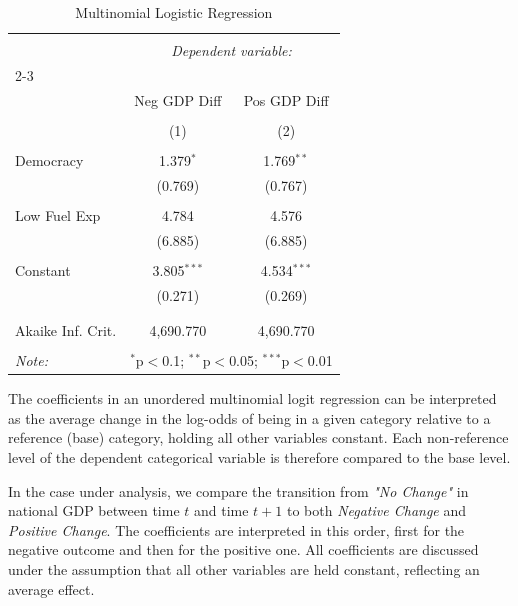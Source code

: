 \documentclass[12pt,letterpaper]{article}
\begin{document}
\begin{table}[!htbp] \centering 
	\caption{Multinomial Logistic Regression} 
	\label{} 
	\begin{tabular}{@{\extracolsep{5pt}}lcc} 
		\\[-1.8ex]\hline 
		\hline \\[-1.8ex] 
		& \multicolumn{2}{c}{\textit{Dependent variable:}} \\ 
		\cline{2-3} 
		\\[-1.8ex] & Neg GDP Diff & Pos GDP Diff \\ 
		\\[-1.8ex] & (1) & (2)\\ 
		\hline \\[-1.8ex] 
		Democracy & 1.379$^{*}$ & 1.769$^{**}$ \\ 
		& (0.769) & (0.767) \\ 
		& & \\ 
		Low Fuel Exp & 4.784 & 4.576 \\ 
		& (6.885) & (6.885) \\ 
		& & \\ 
		Constant & 3.805$^{***}$ & 4.534$^{***}$ \\ 
		& (0.271) & (0.269) \\ 
		& & \\ 
		\hline \\[-1.8ex] 
		Akaike Inf. Crit. & 4,690.770 & 4,690.770 \\ 
		\hline 
		\hline \\[-1.8ex] 
		\textit{Note:}  & \multicolumn{2}{r}{$^{*}$p$<$0.1; $^{**}$p$<$0.05; $^{***}$p$<$0.01} \\ 
	\end{tabular} 
\end{table} 

\vspace{0.5cm}
\noindent The coefficients in an unordered multinomial logit regression can be interpreted as the average change in the log-odds of being in a given category relative to a reference (base) category, holding all other variables constant. Each non-reference level of the dependent categorical variable is therefore compared to the base level.

\noindent In the case under analysis, we compare the transition from \emph{"No Change"} in national GDP between time $t$ and time $t+1$ to both \emph{Negative Change} and \emph{Positive Change}. The coefficients are interpreted in this order, first for the negative outcome and then for the positive one. All coefficients are discussed under the assumption that all other variables are held constant, reflecting an average effect.
\end{document}
